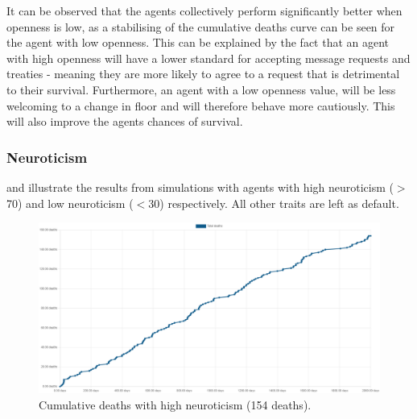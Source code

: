 It can be observed that the agents collectively perform significantly better when openness is low, as a stabilising of the cumulative deaths curve can be seen for the agent with low openness. This can be explained by the fact that an agent with high openness will have a lower standard for accepting message requests and treaties - meaning they are more likely to agree to a request that is detrimental to their survival. Furthermore, an agent with a low openness value, will be less welcoming to a change in floor and will therefore behave more cautiously. This will also improve the agents chances of survival. 

\subsubsection{Neuroticism}
\label{subsubsec: Neuroticism}

 and  illustrate the results from simulations with agents with high neuroticism ($>$70) and low neuroticism ($<$30) respectively. All other traits are left as default.

\begin{figure}[H]
    \begin{center}
        \includegraphics[scale=0.25]{009_team_7_agent_design/Images/Cumulative Deaths, With Treaties, T7Only, 2000days, 20food, High Neur, 154deaths.png}
    \end{center}
    \caption{Cumulative deaths with high neuroticism (154 deaths).}
    \label{fig: High Neuroticism}
\end{figure}

